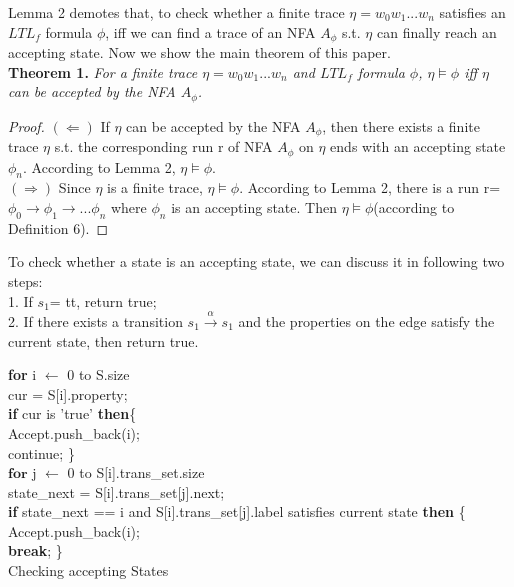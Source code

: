 Lemma 2 demotes that, to check whether a finite trace $\eta = w_0 w_1 ... w_n$ satisfies an $LTL_f$ formula $\phi$, iff we can find a trace of an NFA $A_\phi$ s.t. $\eta$ can finally reach an accepting state. Now we show the main theorem of this paper.\\
{\bf Theorem 1.}  {\it For a finite trace  $\eta = w_0w_1...w_n $ and $LTL_f$ formula $\phi$, $\eta \models \phi$ iff $\eta$ can be accepted by the NFA $A_\phi$.}
\begin{proof} $(\Leftarrow)$ If $\eta$ can be accepted by the NFA $A_{\phi}$, then there exists a finite trace $\eta$ s.t. the corresponding run r of NFA $A_{\phi}$ on $\eta$ ends with  an accepting state $\phi_n$. According to Lemma 2, $\eta \models \phi$. \\
$(\Rightarrow)$ Since $\eta$ is a finite trace, $\eta \models \phi$. According to Lemma 2, there is a run r= $\phi_0 \to \phi_1 \to ...\phi_n$ where $\phi_n$ is an accepting state. Then $\eta \models \phi$(according to Definition 6).
\end{proof}
To check whether a state is an accepting state, we can  discuss it in following two steps: \\
1. If $s_1 $= tt, return true; \\
2. If there exists a transition  $ s_1 \overset{\alpha}{\rightarrow}s_1$ and  the properties on the edge satisfy the current state, then return true. \\

\IncMargin{1em}
 \begin{algorithm}[H]
    \SetAlgoNoLine
    \BlankLine
\textbf{for} i $\leftarrow$  0 to S.size  \\
\qquad cur = S[i].property;  \\
\qquad  \textbf{if} cur is 'true'   \textbf{then}\{      \\
\qquad \quad Accept.push\_back(i);     \\
\qquad \quad  continue;  \}     \\
\qquad  $ \textbf{for}$ j $\leftarrow$  0 to S[i].trans\_set.size \\
\qquad \quad state\_next = S[i].trans\_set[j].next;  \\
\qquad \quad \textbf{if} state\_next == i and S[i].trans\_set[j].label satisfies current state \textbf{then} \{  \\
\qquad \qquad Accept.push\_back(i);  \\
\qquad \qquad \textbf{break}; \} \\
 \caption{Checking accepting States}
\end{algorithm}
